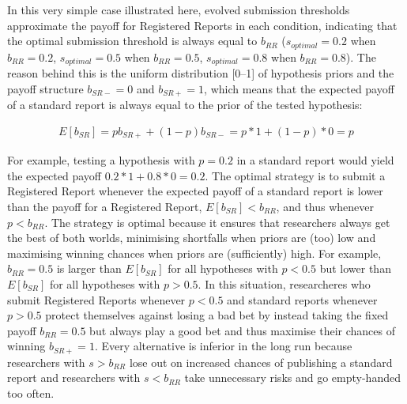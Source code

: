 \documentclass[british,,man,floatsintext]{apa6}
\begin{document}
In this very simple case illustrated here, evolved submission thresholds approximate the payoff for Registered Reports in each condition, indicating that the optimal submission threshold is always equal to \(b_{RR}\) (\(s_{optimal} = 0.2\) when \(b_{RR} = 0.2\), \(s_{optimal} = 0.5\) when \(b_{RR} = 0.5\), \(s_{optimal} = 0.8\) when \(b_{RR} = 0.8\)).
The reason behind this is the uniform distribution {[}0--1{]} of hypothesis priors and the payoff structure \(b_{SR-} = 0\) and \(b_{SR+} = 1\), which means that the expected payoff of a standard report is always equal to the prior of the tested hypothesis:

\begin{align}
E[b_{SR}] = p b_{SR+} + (1-p)b_{SR-} = p * 1 +  (1-p) * 0 = p
\end{align}

For example, testing a hypothesis with \(p = 0.2\) in a standard report would yield the expected payoff \(0.2 * 1 + 0.8 * 0 = 0.2\).
The optimal strategy is to submit a Registered Report whenever the expected payoff of a standard report is lower than the payoff for a Registered Report, \(E[b_{SR}] < b_{RR}\), and thus whenever \(p < b_{RR}\).
The strategy is optimal because it ensures that researchers always get the best of both worlds, minimising shortfalls when priors are (too) low and maximising winning chances when priors are (sufficiently) high.
For example, \(b_{RR} = 0.5\) is larger than \(E[b_{SR}]\) for all hypotheses with \(p < 0.5\) but lower than \(E[b_{SR}]\) for all hypotheses with \(p > 0.5\).
In this situation, researcheres who submit Registered Reports whenever \(p<0.5\) and standard reports whenever \(p>0.5\) protect themselves against losing a bad bet by instead taking the fixed payoff \(b_{RR} = 0.5\) but always play a good bet and thus maximise their chances of winning \(b_{SR+} = 1\).
Every alternative is inferior in the long run because researchers with \(s > b_{RR}\) lose out on increased chances of publishing a standard report and researchers with \(s < b_{RR}\) take unnecessary risks and go empty-handed too often.
\end{document}
